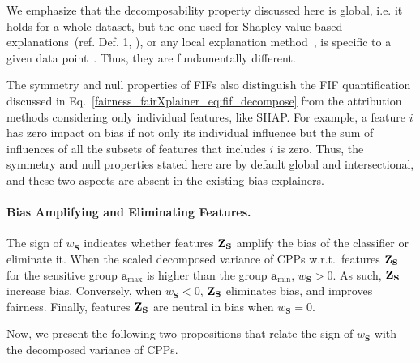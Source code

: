 We emphasize that the decomposability property discussed here is global, i.e. it holds for a whole dataset, but the one used for Shapley-value based explanations~(ref. Def. 1, \cite{lundberg2017unified}), or any local explanation method~\cite{han2022explanation}, is specific to a given data point~\cite{sliwinski2019axiomatic}. Thus, they are fundamentally different.

The symmetry and null properties of FIFs also distinguish the FIF quantification discussed in Eq.~\eqref{fairness_fairXplainer_eq:fif_decompose} from the attribution methods considering only individual features, like SHAP. For example, a feature $i$ has zero impact on bias if not only its individual influence but the sum of influences of all the subsets of features that includes $i$ is zero. Thus, the symmetry and null properties stated here are by default global and intersectional, and these two aspects are absent in the existing bias explainers.

\paragraph{Bias Amplifying and Eliminating Features.} The sign of $ w_{\mathbf{S}} $ indicates whether features $ \mathbf{Z}_{\mathbf{S}} $ amplify the bias of the classifier or eliminate it. When the scaled decomposed variance of CPPs w.r.t.\ features $ \mathbf{Z}_{\mathbf{S}} $ for the sensitive group $ \mathbf{a}_{\max} $ is higher than the group $ \mathbf{a}_{\min} $, $ w_{\mathbf{S}} > 0 $. As such, $ \mathbf{Z}_{\mathbf{S}} $ increase bias. Conversely, when $ w_{\mathbf{S}} < 0 $, $ \mathbf{Z}_{\mathbf{S}} $ eliminates bias, and improves fairness. Finally, features $ \mathbf{Z}_{\mathbf{S}} $ are neutral in bias when $ w_{\mathbf{S}} = 0 $. 

Now, we present the following two propositions that relate the sign of $ w_{\mathbf{S}} $ with the decomposed variance of CPPs.

